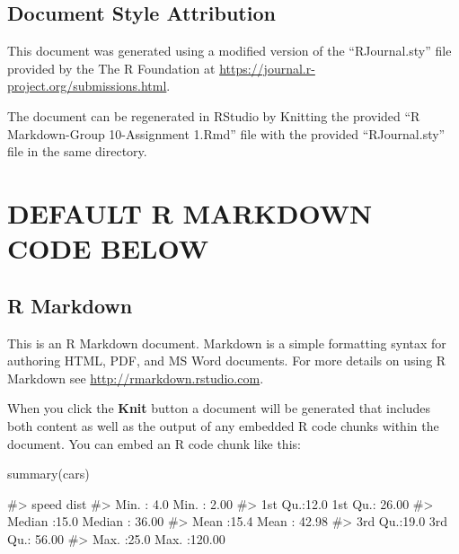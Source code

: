 \begin{Schunk}
\end{Schunk}

\hypertarget{document-style-attribution}{%
\subsection{Document Style
Attribution}\label{document-style-attribution}}

This document was generated using a modified version of the
``RJournal.sty'' file provided by the The R Foundation at
\url{https://journal.r-project.org/submissions.html}.

The document can be regenerated in RStudio by Knitting the provided ``R
Markdown-Group 10-Assignment 1.Rmd'' file with the provided
``RJournal.sty'' file in the same directory.

\hypertarget{default-r-markdown-code-below}{%
\section{DEFAULT R MARKDOWN CODE
BELOW}\label{default-r-markdown-code-below}}

\hypertarget{r-markdown}{%
\subsection{R Markdown}\label{r-markdown}}

This is an R Markdown document. Markdown is a simple formatting syntax
for authoring HTML, PDF, and MS Word documents. For more details on
using R Markdown see \url{http://rmarkdown.rstudio.com}.

When you click the \textbf{Knit} button a document will be generated
that includes both content as well as the output of any embedded R code
chunks within the document. You can embed an R code chunk like this:

\begin{Schunk}
\begin{Sinput}
summary(cars)
\end{Sinput}
\begin{Soutput}
#>      speed           dist       
#>  Min.   : 4.0   Min.   :  2.00  
#>  1st Qu.:12.0   1st Qu.: 26.00  
#>  Median :15.0   Median : 36.00  
#>  Mean   :15.4   Mean   : 42.98  
#>  3rd Qu.:19.0   3rd Qu.: 56.00  
#>  Max.   :25.0   Max.   :120.00
\end{Soutput}
\end{Schunk}

